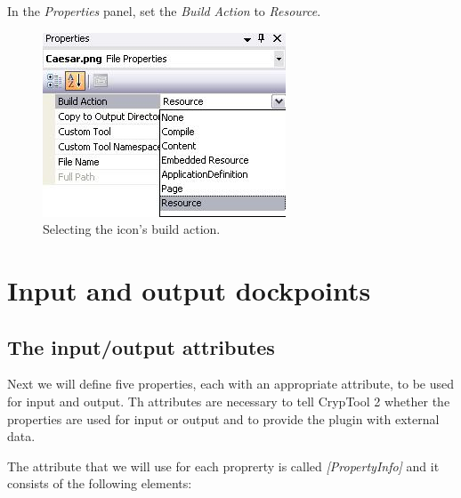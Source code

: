 In the \textit{Properties} panel, set the \textit{Build Action} to \textit{Resource}.

\begin{figure}[h!]
	\centering
		\includegraphics{figures/icon_build_action.jpg}
	\caption{Selecting the icon's build action.}
	\label{fig:icon_build_action}
\end{figure}
\clearpage

\section{Input and output dockpoints}
\label{sec:InputAndOutputDockpoints}

\subsection{The input/output attributes}
\label{sec:TheInputOutputAttributes}

Next we will define five properties, each with an appropriate attribute, to be used for input and output. Th attributes are necessary to tell CrypTool 2 whether the properties are used for input or output and to provide the plugin with external data.

The attribute that we will use for each proprerty is called \textit{[PropertyInfo]} and it consists of the following elements:

